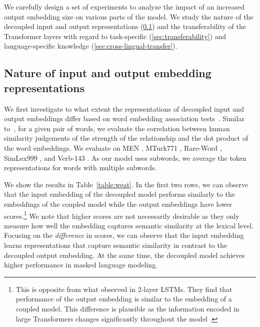 \documentclass{article} \usepackage{iclr2021_conference,times}
\begin{document}
We carefully design a set of experiments to analyze the impact of an increased output embedding size on various parts of the model. 
We study the nature of the decoupled input and output representations (\textsection \ref{sec:weat}) and the transferability of the Transformer layers with regard to task-specific (\textsection \ref{sec:transferability}) and language-specific knowledge (\textsection \ref{sec:cross-lingual-transfer}).



\subsection{Nature of input and output embedding representations}
\label{sec:weat}



We first investigate to what extent the representations of decoupled input and output embeddings differ based on word embedding association tests~\citep{WEAT_tests}. Similar to~\citep{Press2017}, for a given pair of words, we evaluate the correlation between human similarity judgements of the strength of the relationship and the dot product of the word embeddings. We evaluate on MEN \citep{bruni2014multimodal}, MTurk771 \citep{halawi2012large}, Rare-Word \citep{luong2013better}, SimLex999 \citep{hill2015simlex}, and Verb-143 \citep{baker2014unsupervised}. As our model uses subwords, we average the token representations for words with multiple subwords.





We show the results in Table~\ref{table:weat}. In the first two rows, we can observe that the input embedding of the decoupled model performs similarly to the embeddings of the coupled model while the output embeddings have lower scores.\footnote{This is opposite from what \citet{Press2017} observed in 2-layer LSTMs. They find that performance of the output embedding is similar to the embedding of a coupled model. This difference is plausible as the information encoded in large Transformers changes significantly throughout the model \citep{Tenney2019}.} We note that higher scores are not necessarily desirable as they only measure how well the embedding captures semantic similarity at the lexical level. Focusing on the \textit{difference} in scores, we can observe that the input embedding learns representations that capture semantic similarity in contrast to the decoupled output embedding. At the same time, the decoupled model achieves higher performance in masked language modeling.
\end{document}
